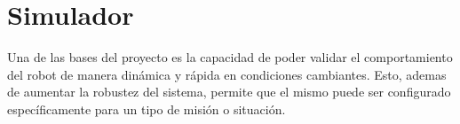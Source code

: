 \chapter{Simulador}

\label{Chapter:Simulador} 
Una de las bases del proyecto es la capacidad de poder validar el comportamiento del robot de manera dinámica y rápida en condiciones cambiantes. Esto, ademas de aumentar la robustez del sistema, permite que el mismo puede ser configurado específicamente para un tipo de misión o situación.

